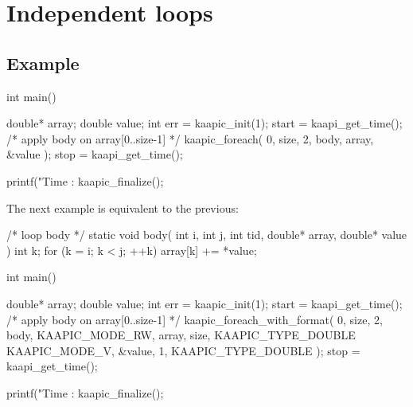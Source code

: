 \documentclass[a4paper, 11pt]{article}
\makeatletter
\newenvironment{apisection}[2][noshortnameprovided]{%
  \newpage
  \section{#2}
  \label{api@#1}
  \newcommand{\api@newpart}[4][noshortpartnameprovided]{%
    \newenvironment{##1}{%
      \subsection{##2}%
      \label{api@#1@##1}%
      ##3%
    }{##4}%
  }%
  \api@newpart[synopsis]{Synopsis}{}{}%
  \api@newpart[desc]{Description}{}{}%
  \api@newpart[params]{Parameters}{%
    \let\api@indesc\@empty
    \newcommand{\param}[1]{%
      \def\api@indesc{yes}%
      \begin{description}%
        \renewcommand{\param}[1]{\item[########1]}%
      \item[####1]
      }%
      \newenvironment{parameters}{%
        \begin{description}%
          \renewcommand{\param}[1]{\item[########1]}%
        }{%
        \end{description}%
      }
    }{%
      \ifx\api@indesc\@empty\relax\else%
    \end{description}%
    \fi%
  }%
  \api@newpart[ret]{Return value}{%
    \newcommand{\otherret}{\par\medskip\noindent}%
  }{}%
  \api@newpart[example]{Example}{}{}%
}{}
\makeatother
\begin{document}
\begin{apisection}[loop]{Independent loops}
\begin{example}
\begin{code}
  int main()
  {
    double* array;
    double value;
    int err = kaapic_init(1);
    start = kaapi_get_time(); 
    /* apply body on array[0..size-1] */
    kaapic_foreach( 0, size, 2, body, array, &value );
    stop = kaapi_get_time(); 

    printf("Time : %
    kaapic_finalize();
  }
    \end{code}

    The next example is equivalent to the previous:
    \begin{code}
  /* loop body */
  static void body(
    int i, int j, int tid, double* array, double* value
  ) 
  {
    int k;
    for (k = i; k < j; ++k)
      array[k] += *value;
  }

  int main()
  {
    double* array;
    double value;
    int err = kaapic_init(1);
    start = kaapi_get_time(); 
    /* apply body on array[0..size-1] */
    kaapic_foreach_with_format( 0, size, 2, body, 
        KAAPIC_MODE_RW, array, size, KAAPIC_TYPE_DOUBLE
        KAAPIC_MODE_V, &value, 1,  KAAPIC_TYPE_DOUBLE
    );
    stop = kaapi_get_time(); 

    printf("Time : %
    kaapic_finalize();
  }
    \end{code}
  \end{example}
\end{apisection}
\end{document}
